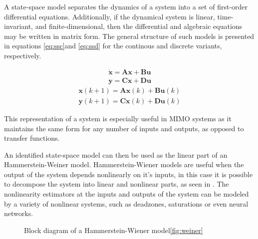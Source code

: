 A state-space model separates the dynamics of a system into a set of first-order differential equations.
Additionally, if the dynamical system is linear, time-invariant, and finite-dimensional, then the differential and algebraic equations may be written in matrix form. The general structure of such models is presented in equations \ref{eq:ssc}and \ref{eq:ssd} for the continous and discrete variants, respectively.

\begin{align}\label{eq:ssc}
\dot{\mathbf{x}} = \mathbf{A}\mathbf{x} + \mathbf{B}\mathbf{u} \\
\mathbf{y} = \mathbf{C}\mathbf{x} + \mathbf{D}\mathbf{u}
\end{align}
\vspace{-0.5cm}
\begin{align}\label{eq:ssd}
\mathbf{x}(k+1) = \mathbf{A}\mathbf{x}(k) + \mathbf{B}\mathbf{u}(k)\\
\mathbf{y}(k+1) = \mathbf{C}\mathbf{x}(k) + \mathbf{D}\mathbf{u}(k)
\end{align}

This representation of a system is especially useful in MIMO systems as it maintains the same form for any number of inputs and outputs, as opposed to transfer functions.

An identified state-space model can then be used as the linear part of an Hammerstein-Weiner model.
Hammerstein-Wiener models are useful when the output of the system depends nonlinearly on it's inputs, in this case it is possible to decompose the system into linear and nonlinear parts, as seen in . 
The nonlinearity estimators at the inputs and outputs of the system can be modeled by a variety of nonlinear systems, such as deadzones, saturations or even neural networks.

\begin{figure} 
\centering
{}
\caption{Block diagram of a Hammerstein-Wiener model\ref{fig:weiner}}
\label{weiner}
\end{figure}

